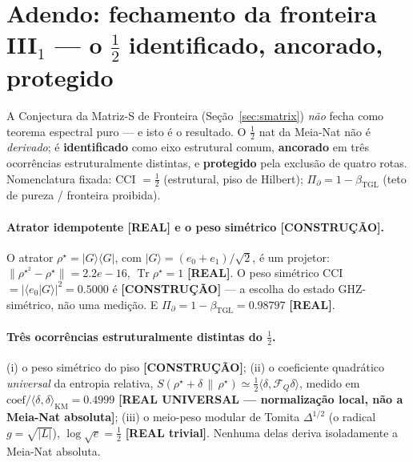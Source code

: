 \documentclass[12pt,a4paper]{article}
\newcommand{\betatgl}{\beta_{\text{TGL}}}
\newcommand{\rhostar}{\rho^{\star}}
\begin{document}
\section{Adendo: fechamento da fronteira III$_1$ --- o $\tfrac12$ identificado, ancorado, protegido}
\label{sec:halfnat-closure}
A Conjectura da Matriz-S de Fronteira (Seção~\ref{sec:smatrix}) \emph{não} fecha como teorema espectral puro --- e isto é o resultado. O $\tfrac12$ nat da Meia-Nat não é \emph{derivado}; é \textbf{identificado} como eixo estrutural comum, \textbf{ancorado} em três ocorrências estruturalmente distintas, e \textbf{protegido} pela exclusão de quatro rotas. Nomenclatura fixada: CCI $=\tfrac12$ (estrutural, piso de Hilbert); $\Pi_\partial = 1-\betatgl$ (teto de pureza / fronteira proibida).

\paragraph{Atrator idempotente \textbf{[REAL]} e o peso simétrico \textbf{[CONSTRUÇÃO]}.} O atrator $\rhostar = |G\rangle\langle G|$, com $|G\rangle = (e_0+e_1)/\sqrt2$, é um projetor: $\lVert\rhostar^2 - \rhostar\rVert = 2.2e-16$, $\operatorname{Tr}\rhostar = 1$ \textbf{[REAL]}. O peso simétrico CCI $= |\langle e_0|G\rangle|^2 = 0.5000$ é \textbf{[CONSTRUÇÃO]} --- a escolha do estado GHZ-simétrico, não uma medição. E $\Pi_\partial = 1-\betatgl = 0.98797$ \textbf{[REAL]}.

\paragraph{Três ocorrências estruturalmente distintas do $\tfrac12$.} (i) o peso simétrico do piso \textbf{[CONSTRUÇÃO]}; (ii) o coeficiente quadrático \emph{universal} da entropia relativa, $S(\rhostar+\delta\,\|\,\rhostar) \simeq \tfrac12\langle\delta,\mathcal F_Q\delta\rangle$, medido em $\text{coef}/\langle\delta,\delta\rangle_{\mathrm{KM}} = 0.4999$ \textbf{[REAL UNIVERSAL --- normalização local, não a Meia-Nat absoluta]}; (iii) o meio-peso modular de Tomita $\Delta^{1/2}$ (o radical $g=\sqrt{|L|}$), $\log\sqrt e = \tfrac12$ \textbf{[REAL trivial]}. Nenhuma delas deriva isoladamente a Meia-Nat absoluta.
\end{document}
